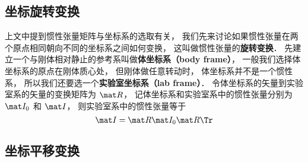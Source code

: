 \subsection{坐标旋转变换}
上文中提到惯性张量矩阵与坐标系的选取有关， 我们先来讨论如果惯性张量在两个原点相同朝向不同的坐标系之间如何变换， 这叫做惯性张量的\textbf{旋转变换}． 先建立一个与刚体相对静止的参考系叫做\textbf{体坐标系（body frame）}， 一般我们选择体坐标系的原点在刚体质心处， 但刚体做任意转动时， 体坐标系并不是一个惯性系， 所以我们还要选一个\textbf{实验室坐标系（lab frame）}． 令体坐标系的矢量到实验室系的矢量的变换矩阵为 $\mat R$， 记体坐标系和实验室系中的惯性张量分别为 $\mat I_0$ 和 $\mat I$， 则实验室系中的惯性张量等于
\begin{equation}
\mat I = \mat R \mat I_0 \mat R\Tr
\end{equation}

\subsection{坐标平移变换}




